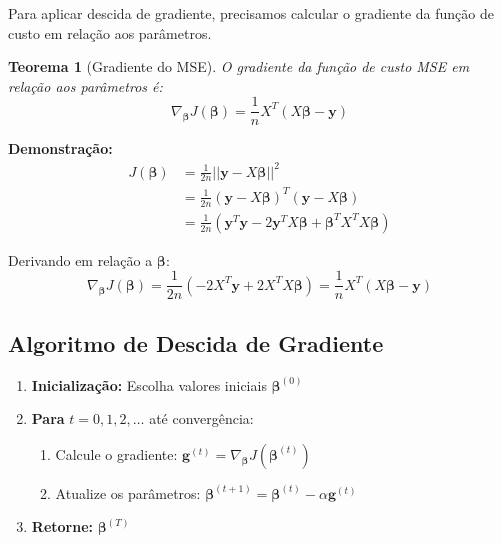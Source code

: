 \documentclass[a4paper,12pt]{article}
\newtheorem{teorema}{Teorema}[section]
\begin{document}
Para aplicar descida de gradiente, precisamos calcular o gradiente da função de custo em relação aos parâmetros.

\begin{teorema}[Gradiente do MSE]
O gradiente da função de custo MSE em relação aos parâmetros é:
\begin{equation}
    \nabla_{\boldsymbol{\beta}} J(\boldsymbol{\beta}) = \frac{1}{n}X^T(X\boldsymbol{\beta} - \mathbf{y})
    \label{eq:gradiente}
\end{equation}
\end{teorema}

\textbf{Demonstração:}
\begin{align}
    J(\boldsymbol{\beta}) &= \frac{1}{2n}||\mathbf{y} - X\boldsymbol{\beta}||^2 \\
    &= \frac{1}{2n}(\mathbf{y} - X\boldsymbol{\beta})^T(\mathbf{y} - X\boldsymbol{\beta}) \\
    &= \frac{1}{2n}(\mathbf{y}^T\mathbf{y} - 2\mathbf{y}^TX\boldsymbol{\beta} + \boldsymbol{\beta}^TX^TX\boldsymbol{\beta})
\end{align}

Derivando em relação a $\boldsymbol{\beta}$:
\begin{equation}
    \nabla_{\boldsymbol{\beta}} J(\boldsymbol{\beta}) = \frac{1}{2n}(-2X^T\mathbf{y} + 2X^TX\boldsymbol{\beta}) = \frac{1}{n}X^T(X\boldsymbol{\beta} - \mathbf{y})
\end{equation}

\subsection{Algoritmo de Descida de Gradiente}

\begin{enumerate}
    \item \textbf{Inicialização:} Escolha valores iniciais $\boldsymbol{\beta}^{(0)}$
    \item \textbf{Para} $t = 0, 1, 2, \ldots$ até convergência:
    \begin{enumerate}
        \item Calcule o gradiente: $\mathbf{g}^{(t)} = \nabla_{\boldsymbol{\beta}} J(\boldsymbol{\beta}^{(t)})$
        \item Atualize os parâmetros: $\boldsymbol{\beta}^{(t+1)} = \boldsymbol{\beta}^{(t)} - \alpha \mathbf{g}^{(t)}$
    \end{enumerate}
    \item \textbf{Retorne:} $\boldsymbol{\beta}^{(T)}$
\end{enumerate}
\end{document}
